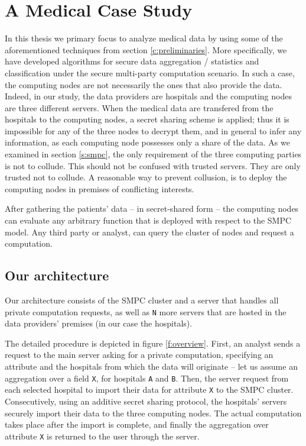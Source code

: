 \chapter{A Medical Case Study}\label{c:medical-study}

In this thesis we primary focus to analyze medical data by using some of the aforementioned techniques from section \ref{c:preliminaries}.
More specifically, we have developed algorithms for secure data aggregation / statistics and classification under the secure multi-party computation scenario.
In such a case, the computing nodes are not necessarily the ones that also provide the data.
Indeed, in our study, the data providers are hospitals and the computing nodes are three different servers.
When the medical data are transfered from the hospitals to the computing nodes, a secret sharing scheme is applied; thus it is impossible for any of the three nodes to decrypt them, and in general to infer any information, as each computing node possesses only a share of the data.
As we examined in section \ref{s:smpc}, the only requirement of the three computing parties is not to collude.
This should not be confused with trusted servers.
They are only trusted not to collude.
A reasonable way to prevent collusion, is to deploy the computing nodes in premises of conflicting interests.


After gathering the patients' data -- in secret-shared form -- the computing nodes can evaluate any arbitrary function that is deployed with respect to the SMPC model.
Any third party or analyst, can query the cluster of nodes and request a computation.


\section{Our architecture }\label{s:architecture}
Our architecture consists of the SMPC cluster and a server  that handles all private computation requests, as well as \texttt{N} more servers that are hosted in the data providers' premises (in our case the hospitals).


The detailed procedure is depicted in figure \ref{f:overview}.
First, an analyst sends a request to the main server asking for a private computation, specifying an attribute and the hospitals from which the data will originate -- let us assume an aggregation over a field \texttt{X}, for hospitals \texttt{A} and \texttt{B}.
Then, the server request from each selected hospital to import their data for attribute \texttt{X} to the SMPC cluster.
Consecutively, using an additive secret sharing protocol, the hospitals' servers securely import their data to the three computing nodes.
The actual computation takes place after the import is complete, and finally the aggregation over attribute \texttt{X} is returned to the user through the server.



